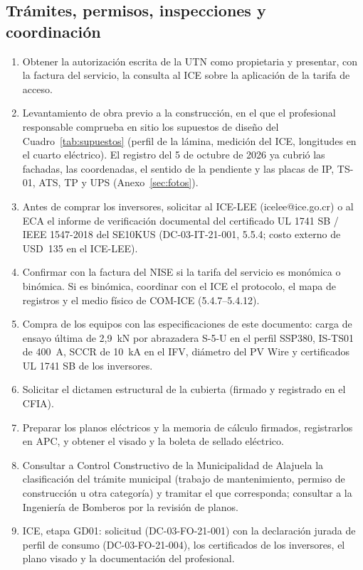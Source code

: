 \documentclass[12pt]{article}
\begin{document}
\subsection{Trámites, permisos, inspecciones y coordinación}
\label{sec:tramites}
\begin{enumerate}
\item Obtener la autorización escrita de la UTN como propietaria y presentar, con la factura del servicio, la consulta al ICE sobre la aplicación de la tarifa de acceso.
\item Levantamiento de obra previo a la construcción, en el que el profesional responsable comprueba en sitio los supuestos de diseño del Cuadro~\ref{tab:supuestos} (perfil de la lámina, medición del ICE, longitudes en el cuarto eléctrico). El registro del 5 de octubre de 2026 ya cubrió las fachadas, las coordenadas, el sentido de la pendiente y las placas de IP, TS-01, ATS, TP y UPS (Anexo~\ref{sec:fotos}).
\item Antes de comprar los inversores, solicitar al ICE-LEE (icelee@ice.go.cr) o al ECA el informe de verificación documental del certificado UL 1741 SB / IEEE 1547-2018 del SE10KUS (DC-03-IT-21-001, 5.5.4; costo externo de USD~135 en el ICE-LEE).
\item Confirmar con la factura del NISE si la tarifa del servicio es monómica o binómica. Si es binómica, coordinar con el ICE el protocolo, el mapa de registros y el medio físico de COM-ICE (5.4.7--5.4.12).
\item Compra de los equipos con las especificaciones de este documento: carga de ensayo última de 2,9~kN por abrazadera S-5-U en el perfil SSP380, IS-TS01 de 400~A, SCCR de 10~kA en el IFV, diámetro del PV Wire y certificados UL 1741 SB de los inversores.
\item Solicitar el dictamen estructural de la cubierta (firmado y registrado en el CFIA).
\item Preparar los planos eléctricos y la memoria de cálculo firmados, registrarlos en APC, y obtener el visado y la boleta de sellado eléctrico.
\item Consultar a Control Constructivo de la Municipalidad de Alajuela la clasificación del trámite municipal (trabajo de mantenimiento, permiso de construcción u otra categoría) y tramitar el que corresponda; consultar a la Ingeniería de Bomberos por la revisión de planos.
\item ICE, etapa GD01: solicitud (DC-03-FO-21-001) con la declaración jurada de perfil de consumo (DC-03-FO-21-004), los certificados de los inversores, el plano visado y la documentación del profesional.

\end{enumerate}
\end{document}
